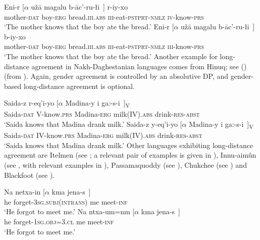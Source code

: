 \documentclass[output=paper
,modfonts
,nonflat]{langsci/langscibook}
\begin{document}
\ea\label{ex:mueller:2}
\ea
\gll     Eni-r [$\alpha$ u\v{z}\={a} magalu b-\={a}c'-ru-\l i~] r-iy-xo \\
         mother-{\scshape dat} {} boy-{\scshape erg} bread.{\scshape iii.abs} {\scshape iii}-eat-{\scshape pstprt-nmlz} {\scshape iv}-know-{\scshape prs} \\
\glt     `The mother knows that the boy ate the bread.'
\ex
\gll     Eni-r [$\alpha$ u\v{z}\={a} \label{2-b}magalu b-\={a}c'-ru-\l i~] b-iy-xo \\
         mother-{\scshape dat} {} boy-{\scshape erg} bread.{\scshape iii.abs} {\scshape iii}-eat-{\scshape pstprt-nmlz} {\scshape iii}-know-{\scshape prs} \\
\glt      `The mother knows that the boy ate the bread.'
\z
\z
Another example for long-distance agreement in Nakh-Daghestanian
languages comes from Hinuq; see (\Next[a--b]) (from
\cite{Forker:11}). Again, gender agreement is controlled by an
absolutive DP, and gender-based long-distance agreement is optional.

\ea\label{ex:mueller:3}
\ea
\gll Sa\textbarglotstop ida-z r-eq'i-yo [$\alpha$ Madina-y \textgamma i ga:-s-\textbeltl i~]\textsubscript{V} \\
     Saida-{\scshape dat} {V}-know.{\scshape prs} {} Madina-{\scshape erg} milk(IV).{\scshape abs} drink-{\scshape res-abst} \\ 
\glt `Saida knows that Madina drank milk.'
\ex
\gll  Sa\textbarglotstop ida-z y-eq'i-yo [$\alpha$ \label{3-b}Madina-y \textgamma i ga:-s-\textbeltl i~]\textsubscript{V} \\
      Saida-{\scshape dat} {IV}-know.{\scshape prs} {} Madina-{\scshape erg} milk({IV}).{\scshape abs} drink-{\scshape res-abst} \\
\glt  `Saida knows that Madina drank milk.'
\z
\z
Other languages exhibiting long-distance agreement are Itelmen (see
\cite{Bobaljik&Wurmbrand:05}; a relevant pair of examples is given in
\Next), Innu-aim\^{u}n (see \cite{Branigan&MacKenzie:02}, with
relevant examples in \NNext), Passamaquoddy (see \cite{Bruening:01}),
Chukchee (see \cite{Boskovic:07}) and Blackfoot (see \cite{Bliss:09}).

\ea\label{ex:mueller:4}
\ea 
\gll Na netxa-in [$\alpha$ kma jena-s~] \\
     he forget-{{\scshape 3sg.subj(intrans)}} {} me meet-{\scshape inf} \\
\glt  `He forgot to meet me.'
\ex
\gll Na ntxa-um=nm [$\alpha$ kma jena-s~] \\
     he forget-{{\scshape 1sg.obj=3.cl}} {} {me} meet-{\scshape inf} \\
\glt `He forgot to meet me.'
\z
\z
\end{document}
